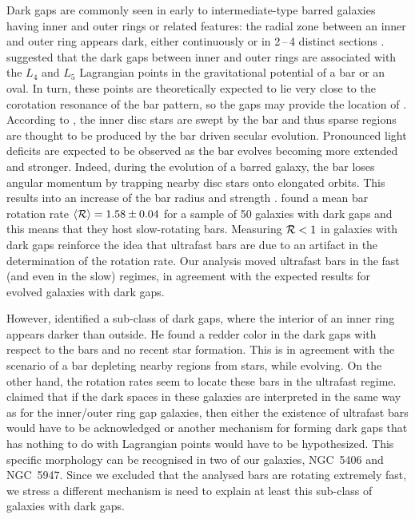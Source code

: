 \documentclass{aa}
\begin{document}
Dark gaps are commonly seen in early to intermediate-type barred galaxies having inner and outer rings or related features: the radial zone between an inner and outer ring appears dark, either continuously or in 2\,--\,4 distinct sections \citep{Kim2016,James2016,Buta2017}. \cite{Buta2017} suggested that the dark gaps between inner and outer rings are associated with the $L_4$ and $L_5$ Lagrangian points in the gravitational potential of a bar or an oval. In turn, these points are theoretically expected to lie very close to the corotation resonance of the bar pattern, so the gaps may provide the location of \rcor. According to \citet{Kim2016}, the inner disc stars are swept by the bar and thus sparse regions are thought to be produced by the bar driven secular evolution. Pronounced light deficits are expected to be observed as the bar evolves becoming more extended and stronger. Indeed, during the evolution of a barred galaxy, the bar loses angular momentum by trapping nearby disc stars onto elongated orbits. This results into an increase of the bar radius and strength \citep{Athanassoula2002,Athanassoula2013,Kim2016}. \cite{Buta2017} found a mean bar rotation rate $\langle {\cal R} \rangle=1.58\pm0.04$ for a sample of 50 galaxies with dark gaps and this means that they host slow-rotating bars. Measuring ${\cal R}<1$ in galaxies with dark gaps reinforce the idea that ultrafast bars are due to an artifact in the determination of the rotation rate. Our analysis moved ultrafast bars in the fast (and even in the slow) regimes, in agreement with the expected results for evolved galaxies with dark gaps.

However, \cite{Buta2017} identified a sub-class of dark gaps, where the interior of an inner ring appears darker than outside. He found a redder color in the dark gaps with respect to the bars and no recent star formation. This is in agreement with the scenario of a bar depleting nearby regions from stars, while evolving. On the other hand, the rotation rates seem to locate these bars in the ultrafast regime. \cite{Buta2017} claimed that if the dark spaces in these galaxies are interpreted in the same way as for the inner/outer ring gap galaxies, then either the existence of ultrafast bars would have to be acknowledged or another mechanism for forming dark gaps that has nothing to do with Lagrangian points would have to be hypothesized. This specific morphology can be recognised in two of our galaxies, NGC~5406 and NGC~5947. Since we excluded that the analysed bars are rotating extremely fast, we stress a different mechanism is need to explain at least this sub-class of galaxies with dark gaps. 
\end{document}
